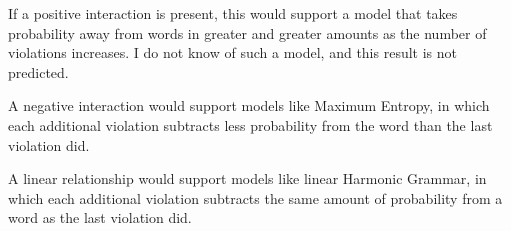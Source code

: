 If a positive interaction is present, this would support a model that takes probability
away from words in greater and greater amounts as the number of violations increases.
I do not know of such a model, and this result is not predicted.

A negative interaction would support models like Maximum Entropy, in which each additional
violation subtracts less probability from the word than the last violation did.

A linear relationship would support models like linear Harmonic Grammar, in which each
additional violation subtracts the same amount of probability from a word as the last
violation did.



